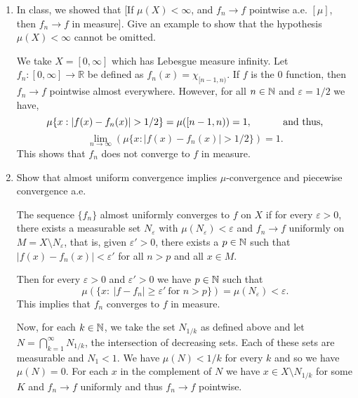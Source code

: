 \documentclass[12pt]{article}
\newcommand{\rl}{\mathbb{R}}
\begin{document}
\begin{enumerate}

    \item In class, we showed that [If $\mu(X) < \infty$, and $f_n \to f$ pointwise a.e. $[\mu]$, then $f_n \to f$ in measure].  Give an example to show that the hypothesis $\mu(X) < \infty$ cannot be omitted. 
    \begin{mybox}
        We take $X=[0,\infty]$ which has Lebesgue measure infinity.
        Let $f_n:[0,\infty]\to\rl$ be defined as $f_n(x)=\chi_{[n-1,n)}$.
        If $f$ is the 0 function, then $f_n\to f$ pointwise almost everywhere.
        However, for all $n\in\mathbb{N}$ and $\varepsilon=1/2$ we have,
        $$\mu\{x:|f(x)-f_n(x)|>1/2\}=\mu([n-1,n))=1, \hspace*{10mm}
        \text{ and thus,}$$
        $$\lim_{n\to\infty}\left(\mu\{x:|f(x)-f_n(x)|>1/2\}\right)=1.$$
        This shows that $f_n$ does not converge to $f$ in measure.
    \end{mybox}

    \item Show that almost uniform convergence implies $\mu$-convergence and
    piecewise convergence a.e.
    \begin{mybox}
        The sequence $\{f_n\}$ almost uniformly converges
        to $f$ on $X$ if for every $\varepsilon>0$, there exists
        a measurable set $N_\varepsilon$ with
        $\mu(N_\varepsilon)<\varepsilon$ and $f_n\to
        f$ uniformly on $M=X\setminus N_\varepsilon$, that is,
        given $\varepsilon'>0$, there exists
        a $p\in\mathbb{N}$ such that $|f(x)-f_n(x)|<\varepsilon'$ for all
        $n>p$ and all $x\in M$.

        \vspace*{2mm}
        Then for every $\varepsilon>0$ and $\varepsilon'>0$
        we have $p\in \mathbb{N}$ such that 
        $$\mu\left(\{x:\ |f-f_n|\geq\varepsilon'
        \ \text{for $n>p$}\}\right)
        =\mu(N_\varepsilon)<\varepsilon.$$
        This implies that $f_n$ converges to $f$ in measure.

        \vspace*{2mm}
        Now, for each $k\in\mathbb{N}$, we take the set
        $N_{1/k}$ as defined above and
        let $N=\bigcap_{k=1}^\infty{N_{1/k}}$, the intersection
        of decreasing sets. Each of
        these sets are measurable and $N_1<1$. We
        have $\mu(N)<1/k$ for every $k$ and so we have
        $\mu(N)=0$. For each $x$ in the complement of $N$
        we have $x\in X\setminus N_{1/k}$ for some
        $K$ and $f_n\to f$ uniformly and thus $f_n\to f$
        pointwise.
    \end{mybox}
    

\end{enumerate}
\end{document}
